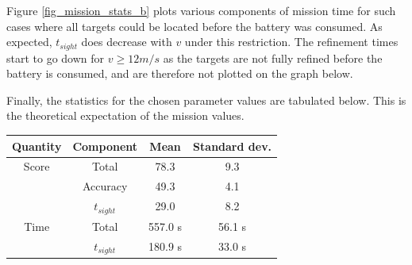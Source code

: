Figure \ref{fig_mission_stats_b} plots various components of mission time for such cases where all targets could be located before the battery was consumed. As expected, $t_{sight}$ does decrease with $v$ under this restriction. The refinement times start to go down for $v \geq 12 m/s$ as the targets are not fully refined before the battery is consumed, and are therefore not plotted on the graph below.

Finally, the statistics for the chosen parameter values are tabulated below. This is the theoretical expectation of the mission values.

\begin{center}
    \begin{tabular}{ | c | c | c | c | }
    \hline
    Quantity & Component & Mean & Standard dev. \\
    \hline
    Score & Total & 78.3 & 9.3 \\
    		  & Accuracy & 49.3 & 4.1 \\
     	  & $t_{sight}$ & 29.0 & 8.2 \\ \hline
    Time  & Total & 557.0 s & 56.1 s \\
     	  & $t_{sight}$ & 180.9 s & 33.0 s \\ \hline
    \end{tabular}
\end{center}
